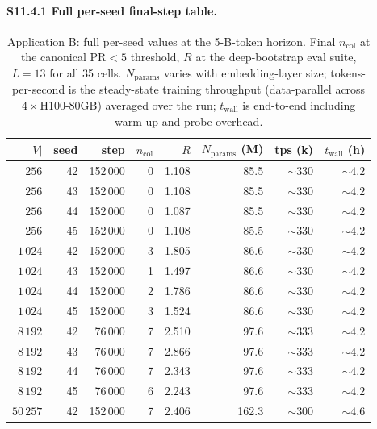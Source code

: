 \documentclass[11pt,a4paper]{article}
\begin{document}
\paragraph{S11.4.1 Full per-seed final-step table.}

\begin{table}[h]
\centering
\small
\caption{Application B: full per-seed values at the 5-B-token horizon.
Final $n_\mathrm{col}$ at the canonical PR$\!<\!5$ threshold, $R$
at the deep-bootstrap eval suite, $L\!=\!13$ for all 35 cells.
$N_\mathrm{params}$ varies with embedding-layer size; tokens-per-second
is the steady-state training throughput (data-parallel across
$4\!\times\!$H100-80GB) averaged over the run; $t_\mathrm{wall}$
is end-to-end including warm-up and probe overhead.}
\label{tab:S11-perseed}
\begin{tabular}{rrrrrrrr}
\toprule
$|V|$ & seed & step & $n_\mathrm{col}$ & $R$ & $N_\mathrm{params}$ (M) & tps (k) & $t_\mathrm{wall}$ (h) \\
\midrule
$256$       & 42 & 152\,000 & 0 & 1.108 & 85.5  & $\sim\!330$ & $\sim\!4.2$ \\
$256$       & 43 & 152\,000 & 0 & 1.108 & 85.5  & $\sim\!330$ & $\sim\!4.2$ \\
$256$       & 44 & 152\,000 & 0 & 1.087 & 85.5  & $\sim\!330$ & $\sim\!4.2$ \\
$256$       & 45 & 152\,000 & 0 & 1.108 & 85.5  & $\sim\!330$ & $\sim\!4.2$ \\
\midrule
$1\,024$    & 42 & 152\,000 & 3 & 1.805 & 86.6  & $\sim\!330$ & $\sim\!4.2$ \\
$1\,024$    & 43 & 152\,000 & 1 & 1.497 & 86.6  & $\sim\!330$ & $\sim\!4.2$ \\
$1\,024$    & 44 & 152\,000 & 2 & 1.786 & 86.6  & $\sim\!330$ & $\sim\!4.2$ \\
$1\,024$    & 45 & 152\,000 & 3 & 1.524 & 86.6  & $\sim\!330$ & $\sim\!4.2$ \\
\midrule
$8\,192$    & 42 & 76\,000  & 7 & 2.510 & 97.6  & $\sim\!333$ & $\sim\!4.2$ \\
$8\,192$    & 43 & 76\,000  & 7 & 2.866 & 97.6  & $\sim\!333$ & $\sim\!4.2$ \\
$8\,192$    & 44 & 76\,000  & 7 & 2.343 & 97.6  & $\sim\!333$ & $\sim\!4.2$ \\
$8\,192$    & 45 & 76\,000  & 6 & 2.243 & 97.6  & $\sim\!333$ & $\sim\!4.2$ \\
\midrule
$50\,257$   & 42 & 152\,000 & 7 & 2.406 & 162.3 & $\sim\!300$ & $\sim\!4.6$ \\

\end{tabular}
\end{table}
\end{document}
